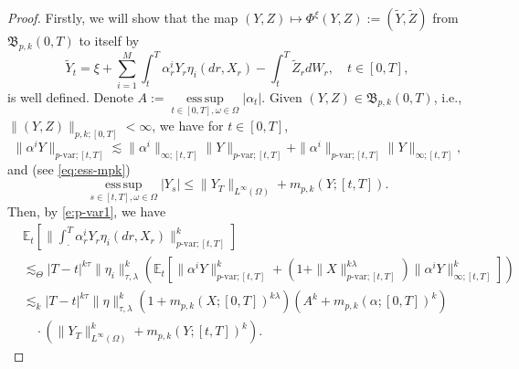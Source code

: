 \documentclass[11pt,reqno]{amsart}
\DeclareMathOperator*{\esssup}{ess\,sup}
\numberwithin{equation}{section}
\begin{document}
\begin{proof}
Firstly, we will show that the map $(Y,Z)\mapsto  \Phi^\xi(Y, Z):= (\tilde Y, \tilde Z)$ from $\mathfrak B_{p,k}(0,T) $ to itself by
\begin{equation}\label{e:solution-map}
\tilde{Y}_{t} = \xi + \sum_{i=1}^{M}\int_{t}^{T}\alpha^{i}_{r}Y_{r}\eta_{i}(dr,X_{r}) - \int_{t}^{T}\tilde{Z}_{r}dW_{r},\quad t\in[0,T],
\end{equation}		 	 
is well defined. 
Denote $A:=\esssup\limits_{t\in[0,T],\omega\in\Omega}|\alpha_t|$.
Given $(Y,Z)\in \mathfrak B_{p,k}(0,T)$, i.e., $\|(Y,Z)\|_{p,k;[0,T]}<\infty$, we have for $t\in[0,T]$, 
\[\|\alpha^{i} Y\|_{p\text{-var};[t,T]}\lesssim \|\alpha^{i}\|_{\infty;[t,T]}\|Y\|_{p\text{-var};[t,T]} + \|\alpha^{i}\|_{p\text{-var};[t,T]}\|Y\|_{\infty;[t,T]},\] 
and (see \eqref{eq:ess-mpk}) 
\begin{equation*}
\esssup\limits_{s\in[t,T],\omega\in\Omega}|Y_s|\le \|Y_{T}\|_{L^{\infty}(\Omega)} + m_{p,k}(Y;[t,T]).
\end{equation*}
Then, by \eqref{e:p-var1}, we have
\begin{equation}\label{e:linear-BSDE-main estimate}
\begin{aligned}
&\mathbb{E}_{t}\left[\Big\|\int_{\cdot}^{T}\alpha^{i}_{r}Y_{r}\eta_{i}(dr,X_{r})\Big\|^{k}_{p\text{-var};[t,T]}\right]\\
&\lesssim_{\Theta}|T-t|^{k\tau}\|\eta_{i}\|^{k}_{\tau,\lambda}\left(\mathbb{E}_{t}\left[\|\alpha^{i} Y\|^{k}_{p\text{-var};[t,T]} + \left(1+\|X\|^{k\lambda}_{p\text{-var};[t,T]}\right)\|\alpha^{i} Y\|^{k}_{\infty;[t,T]}\right]\right)\\
&\lesssim_k |T-t|^{k\tau}\|\eta\|^{k}_{\tau,\lambda}\left(1 + m_{p,k}(X;[0,T])^{k\lambda}\right)\left(A^{k} + m_{p,k}(\alpha;[0,T])^{k}\right)\\
&\quad\cdot\left(\|Y_{T}\|^{k}_{L^{\infty}(\Omega)} + m_{p,k}(Y;[t,T])^{k}\right).
\end{aligned}
\end{equation} 


\end{proof}
\end{document}
